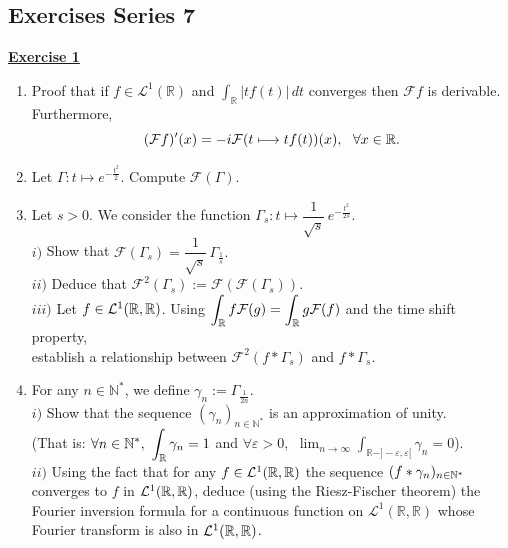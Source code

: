 \subsection{Exercises Series 7}
\vspace*{0.2cm}
\noindent\Large{\underline{\textbf{Exercise 1}}}
\normalsize{}\\
\begin{enumerate}
    \item Proof that if $\displaystyle f\in\mathcal{L}^1(\mathbb{R})$ and 
          $\displaystyle\int_{\mathbb{R}} |tf(t)|\, dt$ converges then $\mathcal{F}f$ is derivable. Furthermore,
          $$(\mathcal{F}f)'(x) = -i\mathcal{F}(t \longmapsto tf(t))(x),\ \ \forall x\in\mathbb{R}.$$
    \item Let $\displaystyle\Gamma : t \longmapsto e^{-\frac{t^2}{2}}$. Compute $\mathcal{F}(\Gamma)$.
    \item Let $s > 0$. We consider the function $\displaystyle\Gamma_s : t \longmapsto 
          \dfrac{1}{\sqrt{s}}\, e^{-\frac{t^2}{2s}}.$\\
        \noindent$i)$ Show that $\displaystyle\mathcal{F}(\Gamma_s) = \dfrac{1}{\sqrt{s}}\,\Gamma_{\frac{1}{s}}.$\\
        \noindent$ii)$ Deduce that $\displaystyle\mathcal{F}^2(\Gamma_s) := \mathcal{F}(\mathcal{F}(\Gamma_s))$.\\
        \noindent$iii)$ Let $f\in\mathcal{L}^1(\mathbb{R},\mathbb{R})$. Using $\displaystyle\int_{\mathbb{R}}f\mathcal{F}(g)=\int_{\mathbb{R}}g\mathcal{F}(f)$ 
                 and the time shift property,\\ 
                 \indent\quad establish a relationship between $\displaystyle\mathcal{F}^2(f*\Gamma_s)$ and $f*\Gamma_s$.
    \item For any $n\in\mathbb{N}^*$, we define $\gamma_n := \Gamma_{\frac{1}{2n}}$.\\
          $i)$ Show that the sequence $(\gamma_n)_{n \in \mathbb{N}^*}$ is an approximation of unity.\\
             \indent\quad (That is:$\displaystyle\ \forall n\in\N^*,\ \int_{\R} \gamma_n = 1$ and $\forall\varepsilon > 0$, 
             $\displaystyle\ \lim_{n\to\infty} \int_{\mathbb{R} - ]-\varepsilon,\varepsilon[} \gamma_n = 0$).\\
          $ii)$ Using the fact that for any $f\in\mathcal{L}^1(\mathbb{R}, \mathbb{R})$ the sequence $(f * \gamma_n)_{n \in \mathbb{N}^*}$ 
          converges to $f$ in $\mathcal{L}^1(\mathbb{R}, \mathbb{R})$, deduce (using the Riesz-Fischer theorem) the Fourier inversion formula
          for a continuous function on $\mathcal{L}^1(\mathbb{R}, \mathbb{R})$ whose Fourier transform is also in 
          $\mathcal{L}^1(\mathbb{R}, \mathbb{R})$.\\
\end{enumerate}

